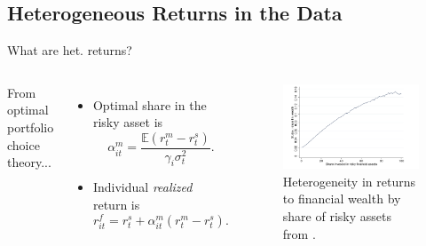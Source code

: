 \documentclass{beamer}
\begin{document}
\subsection{Heterogeneous Returns in the Data}
\begin{frame}{What are het. returns?}

   \begin{columns}
     \small
     From optimal portfolio choice theory...
    \centering

    \begin{itemize}
    \item Optimal share in the risky asset is
    $$ \alpha_{it}^{m} = \frac{\mathbb{E}(r_{t}^{m} - r_{t}^{s})}{\gamma_i \sigma^{2}_{t}}.$$
    \item Individual \textit{realized} return is
    $$ r_{it}^{f} = r_{t}^{s} + \alpha_{it}^{m} (r_{t}^{m} - r_{t}^{s}). $$
    \end{itemize}

    \centering
    \begin{figure}
    \includegraphics[width=\textwidth]{Figures/Fagereng2020Fig1.png}
    \captionsetup{font=scriptsize}
    \caption{Heterogeneity in returns to financial wealth by share of risky assets from \cite{aflgdmlp20}.}
    \end{figure}
  \end{columns}

\end{frame}
\end{document}
